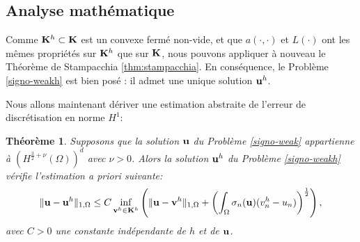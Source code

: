 \documentclass[11pt]{book}
\newtheorem{theorem}{Théorème}[section]
\newcommand{\bt}{\begin{theorem}}
\newcommand{\et}{\end{theorem}}
\def\u{{\bf u}}
\def\vv{{\bf v}}
\def\K{{\bf K}}
\begin{document}
\subsection{Analyse mathématique}

Comme $\K^h \subset \K$ est un convexe fermé non-vide, et que $a(\cdot,\cdot)$ et $L(\cdot)$ ont les mêmes propriétés sur $\K^h$ que sur $\K$, nous pouvons appliquer à nouveau le Théorème de Stampacchia \ref{thm:stampacchia}. En conséquence, le Problème \eqref{signo-weakh} est bien posé : il admet une unique solution $\u^h$. 

\medskip

Nous allons maintenant dériver une estimation abstraite de l'erreur de discrétisation en norme $H^1$:

\bt
\label{cviv}
Supposons que la solution $\u$ du Problème \eqref{signo-weak} appartienne à
$(H^{\frac32+\nu} (\Omega))^d$ avec $\nu >0$.
Alors la solution $\u^h$ 
du Problème \eqref{signo-weakh}
vérifie l'estimation \emph{a priori} suivante:
\begin{align}
\label{cviv1}
\begin{aligned}
 \| \u - \u^h \|_{1,\Omega}
 \leq %
 C  \inf_{\vv^h \in \K^h} \left (
 \| \u - \vv^h\|_{1,\Omega} + 
 \left ( \int_\Omega \sigma_n (\u) ( v^h_n - u_n) \right )^{\frac12} \right ),
\end{aligned}
\end{align}
avec $C > 0$ une constante indépendante de $h$ et de $\u$.
\et
 
\end{document}
